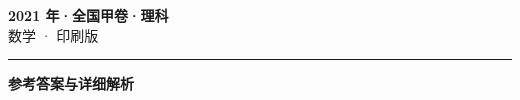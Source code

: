 \documentclass[zihao=5, a4paper]{ctexart}
\begin{document}
\begin{center}
  {\Large\bfseries 2021 年·全国甲卷·理科}\\[4pt]
  {\large 数学 · 印刷版}
\end{center}
\medskip
{}

\par\bigskip\hrule\bigskip
{}
\begin{center}{\large\bfseries 参考答案与详细解析}\end{center}
\smallskip

\end{document}
